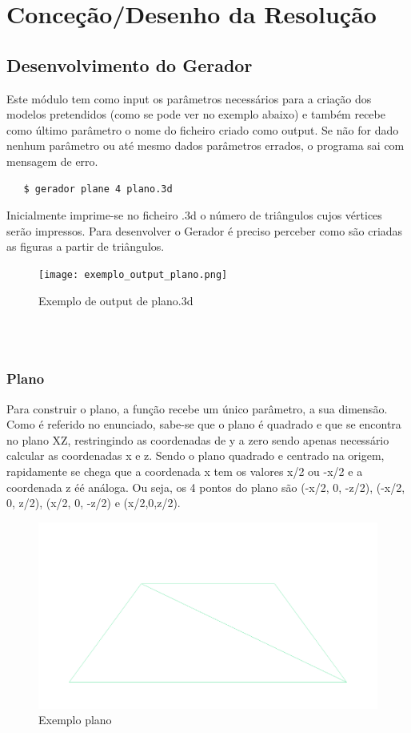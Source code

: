 \documentclass{report}
\begin{document}
\chapter{Conce\c{c}\~{a}o/Desenho da Resolu\c{c}\~{a}o} 
\section{Desenvolvimento do Gerador} %
Este m\'odulo tem como input os par\^ametros necess\'arios para a cria\c{c}\~ao dos modelos pretendidos (como se pode ver no exemplo abaixo) e tamb\'em recebe como \'ultimo par\^ametro o nome do ficheiro criado como output. Se n\~ao for dado nenhum par\^ametro ou at\'e mesmo dados par\^ametros errados, o programa sai com mensagem de erro. 
\begin{lstlisting}
   $ gerador plane 4 plano.3d
\end{lstlisting}

Inicialmente imprime-se no ficheiro .3d o n\'umero de tri\^angulos cujos v\'ertices ser\~ao impressos.
Para desenvolver o Gerador \'e preciso perceber como s\~ao criadas as figuras a partir de tri\^angulos.
\begin{figure}[h]
\centering
\texttt{[image: exemplo\_output\_plano.png]}
\caption{Exemplo de output de plano.3d}
\end{figure}
\\
\\
\subsection{Plano}
Para construir o plano, a fun\c{c}\~ao recebe um \'unico par\^ametro, a sua dimens\~ao.
Como \'e referido no enunciado, sabe-se que o plano \'e quadrado e que se encontra
no plano XZ, restringindo as coordenadas de y a zero sendo apenas necess\'ario calcular as coordenadas x e z. Sendo o 
plano quadrado e centrado na origem, rapidamente se chega que a
coordenada x tem os valores x/2 ou -x/2 e a coordenada z \'eé an\'aloga.
Ou seja, os 4 pontos do plano s\~ao (-x/2, 0, -z/2), (-x/2, 0, z/2),
(x/2, 0, -z/2) e (x/2,0,z/2).
\begin{figure}[h]
\centering
\includegraphics[scale=0.15]{plano.png}
\caption{Exemplo plano}
\end{figure}
\clearpage
\end{document}
